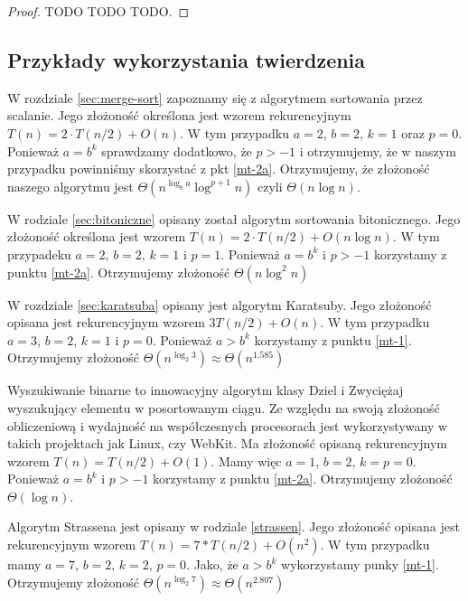 \begin{proof}
 TODO TODO TODO.
\end{proof}

\subsection{Przykłady wykorzystania twierdzenia}

W rozdziale \ref{sec:merge-sort} zapoznamy się z algorytmem sortowania przez scalanie.
Jego złożoność określona jest wzorem rekurencyjnym $T(n) = 2 \cdot T(n/2) + O(n)$.
W tym przypadku $a = 2$, $b = 2$, $k = 1$ oraz $p = 0$.
Ponieważ $a = b^k$ sprawdzamy dodatkowo, że $p > -1$ i otrzymujemy, że w naszym przypadku powinniśmy skorzystać z pkt \ref{mt-2a}.
Otrzymujemy, że złożoność naszego algorytmu jest $\Theta(n^{\log_b a} \log^{p + 1} n)$ czyli $\Theta(n \log n)$.

W rodziale \ref{sec:bitoniczne} opisany został algorytm sortowania bitonicznego. Jego złożoność określona jest wzorem $T(n) = 2 \cdot T(n/2) + O(n \log n)$. W tym przypadeku $a = 2$, $b = 2$, $k=1$ i $p = 1$.
Ponieważ $a = b^k$ i $p > -1$ korzystamy z punktu \ref{mt-2a}. Otrzymujemy złożoność $\Theta(n \log^2 n)$

W rozdziale \ref{sec:karatsuba} opisany jest algorytm Karatsuby. Jego złożoność opisana jest rekurencyjnym wzorem $3 T(n/2) + O(n)$. W tym przypadku $a = 3$, $b = 2$, $k=1$ i $p=0$.
Ponieważ $a > b^k$ korzystamy z punktu \ref{mt-1}. Otrzymujemy złożoność $\Theta(n^{\log_{2} 3}) \approx \Theta(n^{1.585})$

Wyszukiwanie binarne to innowacyjny algorytm klasy Dziel i Zwyciężaj wyszukujący elementu w posortowanym ciągu. Ze względu na swoją złożoność obliczeniową i wydajność na współczesnych procesorach jest wykorzystywany w takich projektach jak Linux, czy WebKit. Ma złożoność opisaną rekurencyjnym wzorem $T(n) = T(n/2) + O(1)$.
Mamy więc $a = 1$, $b = 2$, $k = p = 0$.
Ponieważ $a = b^k$ i $p > -1$ korzystamy z punktu \ref{mt-2a}. Otrzymujemy złożoność $\Theta(\log n)$.

Algorytm Strassena jest opisany w rodziale \ref{strassen}. Jego złożoność opisana jest rekurencyjnym wzorem $T(n) = 7 * T(n/2) + O(n^2)$. W tym przypadku mamy $a = 7$, $b = 2$, $k = 2$, $p = 0$. Jako, że $a > b^k$ wykorzystamy punky \ref{mt-1}. Otrzymujemy złożoność $\Theta(n^{\log_{2} 7}) \approx \Theta(n^2.807)$